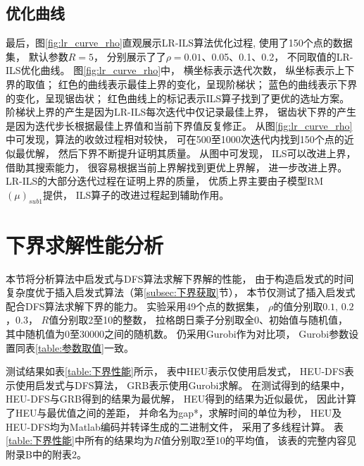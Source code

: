 \subsection{优化曲线}
最后，图\ref{fig:lr_curve_rho}直观展示LR-ILS算法优化过程,
使用了150个点的数据集，
默认参数$R=5$，
分别展示了了$\rho=0.01$、0.05、0.1、0.2，
不同取值的LR-ILS优化曲线。
图\ref{fig:lr_curve_rho}中，
横坐标表示迭代次数，
纵坐标表示上下界的取值；
红色的曲线表示最佳上界的变化，呈现阶梯状；
蓝色的曲线表示下界的变化，呈现锯齿状；
红色曲线上的标记表示ILS算子找到了更优的选址方案。
阶梯状上界的产生是因为LR-ILS每次迭代中仅记录最佳上界，
锯齿状下界的产生是因为迭代步长根据最佳上界值和当前下界值反复修正。
从图\ref{fig:lr_curve_rho}中可发现，算法的收敛过程相对较快，
可在500至1000次迭代内找到150个点的近似最优解，
然后下界不断提升证明其质量。
从图中可发现，
ILS可以改进上界，借助其搜索能力，
很容易根据当前上界解找到更优上界解，
进一步改进上界。
LR-ILS的大部分迭代过程在证明上界的质量，
优质上界主要由子模型RM$(\mu)_{sub1}$提供，
ILS算子的改进过程起到辅助作用。

\section{下界求解性能分析}
\label{sec:下界性能}
本节将分析算法中启发式与DFS算法求解下界解的性能，
由于构造启发式的时间复杂度优于插入启发式算法（第\ref{subsec:下界获取}节），
本节仅测试了插入启发式配合DFS算法求解下界的能力。
实验采用49个点的数据集，
$\rho$的值分别取$0.1$, $0.2$，$0.3$，
$R$值分别取2至10的整数，
拉格朗日乘子分别取全0、初始值与随机值，
其中随机值为0至30000之间的随机数。
仍采用Gurobi作为对比项，
Gurobi参数设置同表\ref{table:参数取值}一致。


测试结果如表\ref{table:下界性能}所示，
表中HEU表示仅使用启发式，
HEU-DFS表示使用启发式与DFS算法，
GRB表示使用Gurobi求解。
在测试得到的结果中，
HEU-DFS与GRB得到的结果为最优解，
HEU得到的结果为近似最优，
因此计算了HEU与最优值之间的差距，
并命名为gap*，求解时间的单位为秒，
HEU及HEU-DFS均为Matlab编码并转译生成的二进制文件，
采用了多线程计算。
表\ref{table:下界性能}中所有的结果均为$R$值分别取2至10的平均值，
该表的完整内容见附录B中的附表2。


